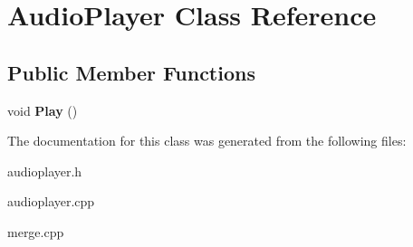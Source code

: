 \hypertarget{class_audio_player}{\section{Audio\-Player Class Reference}
\label{class_audio_player}
}
\subsection*{Public Member Functions}
\begin{DoxyCompactItemize}
\item 
\hypertarget{class_audio_player_afa3f18ddf21af783358873f91cec4783}{void {\bfseries Play} ()}\label{class_audio_player_afa3f18ddf21af783358873f91cec4783}

\end{DoxyCompactItemize}


The documentation for this class was generated from the following files\-:\begin{DoxyCompactItemize}
\item 
audioplayer.\-h\item 
audioplayer.\-cpp\item 
merge.\-cpp\end{DoxyCompactItemize}
